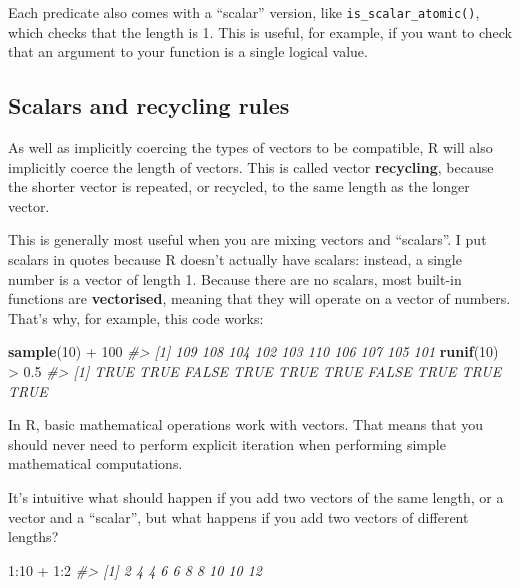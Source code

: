 \documentclass[]{book}
\newenvironment{Shaded}{\begin{snugshade}}{\end{snugshade}}
\newcommand{\KeywordTok}[1]{\textcolor[rgb]{0.13,0.29,0.53}{\textbf{{#1}}}}
\newcommand{\DecValTok}[1]{\textcolor[rgb]{0.00,0.00,0.81}{{#1}}}
\newcommand{\FloatTok}[1]{\textcolor[rgb]{0.00,0.00,0.81}{{#1}}}
\newcommand{\StringTok}[1]{\textcolor[rgb]{0.31,0.60,0.02}{{#1}}}
\newcommand{\CommentTok}[1]{\textcolor[rgb]{0.56,0.35,0.01}{\textit{{#1}}}}
\newcommand{\NormalTok}[1]{{#1}}
\begin{document}
Each predicate also comes with a ``scalar'' version, like
\texttt{is\_scalar\_atomic()}, which checks that the length is 1. This
is useful, for example, if you want to check that an argument to your
function is a single logical value.

\subsection{Scalars and recycling
rules}\label{scalars-and-recycling-rules}

As well as implicitly coercing the types of vectors to be compatible, R
will also implicitly coerce the length of vectors. This is called vector
\textbf{recycling}, because the shorter vector is repeated, or recycled,
to the same length as the longer vector.

This is generally most useful when you are mixing vectors and
``scalars''. I put scalars in quotes because R doesn't actually have
scalars: instead, a single number is a vector of length 1. Because there
are no scalars, most built-in functions are \textbf{vectorised}, meaning
that they will operate on a vector of numbers. That's why, for example,
this code works:

\begin{Shaded}
\begin{Highlighting}[]
\KeywordTok{sample}\NormalTok{(}\DecValTok{10}\NormalTok{) +}\StringTok{ }\DecValTok{100}
\CommentTok{#>  [1] 109 108 104 102 103 110 106 107 105 101}
\KeywordTok{runif}\NormalTok{(}\DecValTok{10}\NormalTok{) >}\StringTok{ }\FloatTok{0.5}
\CommentTok{#>  [1]  TRUE  TRUE FALSE  TRUE  TRUE  TRUE FALSE  TRUE  TRUE  TRUE}
\end{Highlighting}
\end{Shaded}

In R, basic mathematical operations work with vectors. That means that
you should never need to perform explicit iteration when performing
simple mathematical computations.

It's intuitive what should happen if you add two vectors of the same
length, or a vector and a ``scalar'', but what happens if you add two
vectors of different lengths?

\begin{Shaded}
\begin{Highlighting}[]
\DecValTok{1}\NormalTok{:}\DecValTok{10} \NormalTok{+}\StringTok{ }\DecValTok{1}\NormalTok{:}\DecValTok{2}
\CommentTok{#>  [1]  2  4  4  6  6  8  8 10 10 12}
\end{Highlighting}
\end{Shaded}
\end{document}
